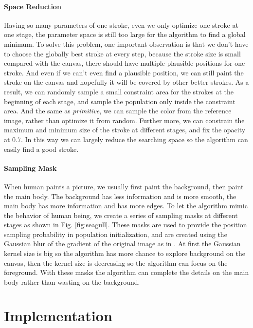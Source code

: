 \documentclass[a4paper,conference]{IEEEtran}
\begin{document}
\paragraph{Space Reduction} Having so many parameters of one stroke, even we only optimize one stroke at one stage, the parameter space is still too large for the algorithm to find a global minimum. To solve this problem, one important observation is that we don't have to choose the globally best stroke at every step, because the stroke size is small compared with the canvas, there should have multiple plausible positions for one stroke. And even if we can't even find a plausible position, we can still paint the stroke on the canvas and hopefully it will be covered by other better strokes. As a result, we can randomly sample a small constraint area for the strokes at the beginning of each stage, and sample the population only inside the constraint area. And the same as \textit{primitive}\cite{primitive}, we can sample the color from the reference image, rather than optimize it from random. Further more, we can constrain the maximum and minimum size of the stroke at different stages, and fix the opacity at $0.7$. In this way we can largely reduce the searching space so the algorithm can easily find a good stroke. 

\paragraph{Sampling Mask} When human paints a picture, we usually first paint the background, then paint the main body. The background has less information and is more smooth, the main body has more information and has more edges. To let the algorithm mimic the behavior of human being, we create a series of sampling masks at different stages as shown in Fig. \ref{fig:seagull}. These masks are used to provide the position sampling probability in population initialization, and are created using the Gaussian blur of the gradient of the original image as in \cite{genetic-drawing}. At first the Gaussian kernel size is big so the algorithm has more chance to explore background on the canvas, then the kernel size is decreasing so the algorithm can focus on the foreground. With these masks the algorithm can complete the details on the main body rather than wasting on the background. 

\section{Implementation}
\end{document}
